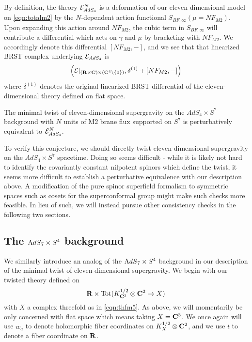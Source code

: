 \documentclass[../main.tex]{subfiles}
\begin{document}
\begin{rmk}
By definition, the theory $\mathcal E_{AdS_4}^N$ is a deformation of our eleven-dimensional model on \eqref{eqn:totalm2} by the $N$-dependent action functional $S_{BF, \infty}(\mu = N F_{M2})$.
Upon expanding this action around $NF_{M2}$, the cubic term in $S_{BF,\infty}$ will contribute a differential which acts on $\gamma$ and $\mu$ by bracketing with $NF_{M2}$. We accordingly denote this differential $[NF_{M2}, - ] $, and we see that that linearized BRST complex underlying $\mathcal{E}_{AdS_4}$ is \[\left ( \mathcal{E} |_{(\mathbf{R}\times \mathbf{C})\times (\mathbf{C}^4\setminus \{0\} ) }, \delta^{(1)} + [NF_{M2},-] \right )\] where $\delta^{(1)}$ denotes the original linearized BRST differential of the eleven-dimensional theory defined on flat space.
\end{rmk}

\begin{conj}\label{conj:ads4}
The minimal twist of eleven-dimensional supergravity on the $AdS_4\times S^7$ background with $N$ units of M2 brane flux supported on $S^7$ is perturbatively equivalent to $\mathcal{E}^N_{AdS_4}$.
\end{conj}

To verify this conjecture, we should directly twist eleven-dimensional supergravity on the $AdS_4\times S^7$ spacetime. Doing so seems difficult - while it is likely not hard to identify the covariantly constant nilpotent spinors which define the twist, it seems more difficult to establish a perturbative equivalence with our description above. A modification of the pure spinor superfield formalism to symmetric spaces such as cosets for the superconformal group might make such checks more feasible. In lieu of such, we will instead pursue other consistency checks in the following two sections{}. 

\subsection{The ${\mathrm{A}dS}_7 \times S^4$ background}

We similarly introduce an analog of the ${\mathrm{A}dS}_7 \times S^4$ background in our description of the minimal twist of eleven-dimensional supergravity.
We begin with our twisted theory defined on
\[
\mathbf{R} \times \operatorname{Tot}(K_{\mathbf{C}^3}^{1/2}\otimes \mathbf{C}^2 \to X)
\]
with $X$ a complex threefold as in \eqref{eqn:thfm5}.
As above, we will momentarily be only concerned with flat space which means taking $X = \mathbf{C}^3$.
We once again will use $w_a$ to denote holomorphic fiber coordinates on $K^{1/2}_{X}\otimes \mathbf{C}^2$, and we use $t$ to denote a fiber coordinate on $\mathbf{R}$.
\end{document}
